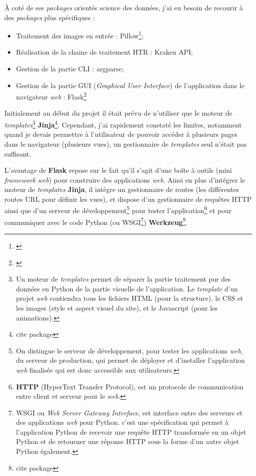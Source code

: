 À coté de ses \textit{packages} orientés science des données, j'ai eu besoin de recourir à des \textit{packages} plus spécifiques : 

\begin{itemize}
    \item Traitement des images en entrée : Pillow\footnote{\cite{noauthor_pillow_nodate}};
    \item Réalisation de la chaine de traitement HTR : Kraken API;
    \item Gestion de la partie CLI : argparse;
    \item Gestion de la partie GUI (\textit{Graphical User Interface}) de l'application dans le navigateur \textit{web} : Flask\footnote{\cite{noauthor_flask_nodate}}
\end{itemize}

Initialement au début du projet il était prévu de n'utiliser que le moteur de \textit{templates}\footnote{Un moteur de \textit{templates} permet de séparer la partie traitement pur des données en Python de la partie visuelle de l'application. Le \textit{template} d'un projet \textit{web} contiendra tous les fichiers HTML (pour la structure), le CSS et les images (style et aspect visuel du site), et le Javascript (pour les animations).} \textbf{Jinja}\footnote{cite package}. Cependant, j'ai rapidement constaté les limites, notamment quand je devais permettre à l'utilisateur de pouvoir accéder à plusieurs pages dans le navigateur (plusieurs vues), un gestionnaire de \textit{templates} seul n'était pas suffisant. 

L'avantage de \textbf{Flask} repose sur le fait qu'il s'agit d'une boîte à outils (mini \textit{framework} \textit{web}) pour construire des applications \textit{web}. Ainsi en plus d'intégrer le moteur de \textit{templates} \textbf{Jinja}, il intègre un gestionnaire de routes (les différentes routes URL pour définir les vues), et dispose d'un gestionnaire de requêtes HTTP ainsi que d'un serveur de développement\footnote{On distingue le serveur de développement, pour tester les applications \textit{web}, du serveur de production, qui permet de déployer et d'installer l'application \textit{web} finalisée qui est donc accessible aux utilisateurs.} pour tester l'application\footnote{\textbf{HTTP} (HyperText Transfer Protocol), est un protocole de communication entre client et serveur pour le \textit{web}.} et pour communiquer avec le code Python (ou WSGI\footnote{WSGI ou \textit{Web Server Gateway Interface}, est interface entre des serveurs et des applications \textit{web} pour Python. c'est une spécification qui permet à l'application Python de recevoir une requête HTTP transformée en un objet Python et de retourner une réponse HTTP sous la forme d’un autre objet Python également.}) \textbf{Werkzeug}\footnote{cite package}.\\

